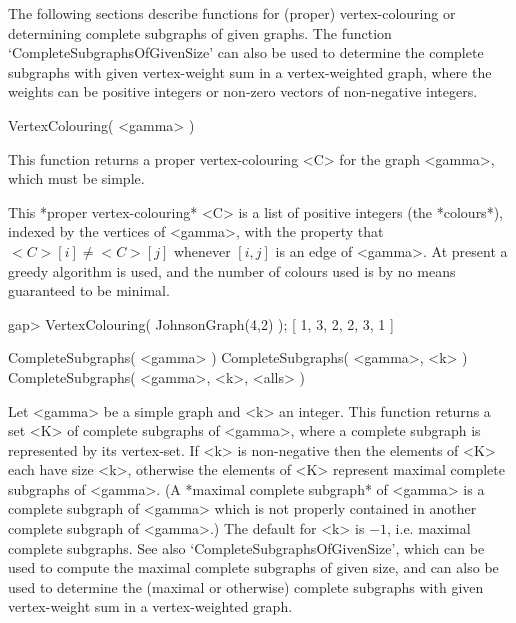 %
%
%
%
\def\GRAPE{\sf GRAPE}
\def\nauty{\it nauty}
\def\G{\Gamma}
\def\Aut{{\rm Aut}\,}
\def\x{\times}

The following sections describe functions for (proper) vertex-colouring
or determining complete subgraphs of given graphs. The function
`CompleteSubgraphsOfGivenSize' can also be used to determine the
complete subgraphs with given vertex-weight sum in a vertex-weighted
graph, where the weights can be positive
integers or non-zero vectors of non-negative integers.


\>VertexColouring( <gamma> )

This function returns a proper vertex-colouring <C> for the graph <gamma>,
which must be simple.

This *proper vertex-colouring* <C> is a list of positive integers (the
*colours*), indexed by the vertices of <gamma>, with the property that
$<C>[i]\not=<C>[j]$ whenever $[i,j]$ is an edge of <gamma>. At present a
greedy algorithm is used, and the number of colours used is by no means
guaranteed to be minimal.

\beginexample
gap> VertexColouring( JohnsonGraph(4,2) );
[ 1, 3, 2, 2, 3, 1 ]
\endexample


\>CompleteSubgraphs( <gamma> )
\>CompleteSubgraphs( <gamma>, <k> )
\>CompleteSubgraphs( <gamma>, <k>, <alls> )

Let <gamma> be a simple graph and <k> an integer. This function returns
a set <K> of complete subgraphs of <gamma>, where a complete subgraph is
represented by its vertex-set.  If <k> is non-negative then the elements
of <K> each have size <k>, otherwise the elements of <K> represent maximal
complete subgraphs of <gamma>. (A *maximal complete subgraph* of <gamma>
is a complete subgraph of <gamma> which is not properly contained in
another complete subgraph of <gamma>.) The default for <k> is $-1$,
i.e. maximal complete subgraphs.  See also `CompleteSubgraphsOfGivenSize',
which can be used to compute the maximal complete subgraphs of given
size, and can also be used to determine the (maximal or otherwise)
complete subgraphs with given vertex-weight sum in a vertex-weighted
graph.

